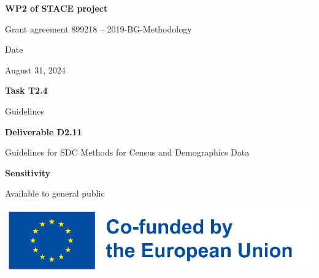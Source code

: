 

\begin{center}

\sffamily
\bfseries
{\Large WP2 of STACE project}\bigskip

{\Large Grant agreement 899218 – 2019-BG-Methodology}\vspace{72pt}

{\Large Date}\bigskip

\mdseries
{\large August 31, 2024}\vspace{36pt}

\bfseries
{\Large Task T2.4}\bigskip

\mdseries
{\large Guidelines}\vspace{36pt}

\bfseries
{\Large Deliverable D2.11}\bigskip

\mdseries
{\large Guidelines for SDC Methods for Census and Demographics Data}\vspace{72pt}

\bfseries
{\Large Sensitivity}\bigskip

\mdseries
{\large Available to general public}\vspace{90pt}
\rmfamily

\includegraphics{eu_funded.png}

\end{center}


\newpage


